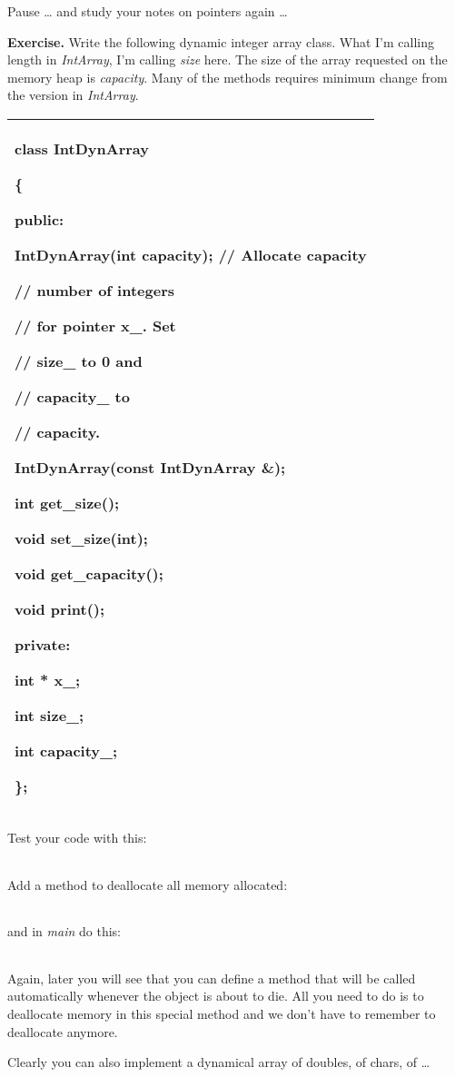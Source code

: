 \documentclass[
]{article}
\begin{document}
\begin{longtable}[]{@{}@{}}
\toprule
\endhead
\bottomrule
\end{longtable}

Pause \ldots{} and study your notes on pointers again \ldots{}

\textbf{Exercise.} Write the following dynamic integer array class. What
I'm calling length in \emph{IntArray}, I'm calling \emph{size} here. The
size of the array requested on the memory heap is \emph{capacity}. Many
of the methods requires minimum change from the version in
\emph{IntArray}.

\begin{longtable}[]{@{}l@{}}
\toprule
\endhead
\begin{minipage}[t]{0.97\columnwidth}\raggedright
class IntDynArray

\{

public:

IntDynArray(int capacity); // Allocate capacity

// number of integers

// for pointer x\_. Set

// size\_ to 0 and

// capacity\_ to

// capacity.

IntDynArray(const IntDynArray \&);

int get\_size();

void set\_size(int);

void get\_capacity();

void print();

private:

int * x\_;

int size\_;

int capacity\_;

\};\strut
\end{minipage}\tabularnewline
\bottomrule
\end{longtable}

Test your code with this:

\begin{longtable}[]{@{}@{}}
\toprule
\endhead
\bottomrule
\end{longtable}

Add a method to deallocate all memory allocated:

\begin{longtable}[]{@{}@{}}
\toprule
\endhead
\bottomrule
\end{longtable}

and in \emph{main} do this:

\begin{longtable}[]{@{}@{}}
\toprule
\endhead
\bottomrule
\end{longtable}

Again, later you will see that you can define a method that will be
called automatically whenever the object is about to die. All you need
to do is to deallocate memory in this special method and we don't have
to remember to deallocate anymore.

Clearly you can also implement a dynamical array of doubles, of chars,
of \ldots{}
\end{document}
